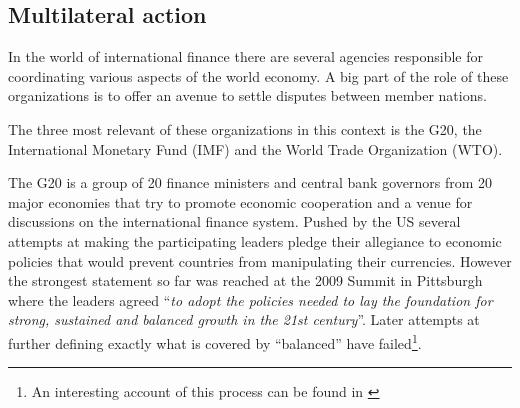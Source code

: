 



\subsection{Multilateral action}

In the world of international finance there are several agencies 
responsible for coordinating various aspects of the world economy. A big 
part of the role of these organizations is to offer an avenue to settle 
disputes between member nations. %

The three most relevant of these organizations in this context is the 
G20, the International Monetary Fund (IMF) and the World Trade 
Organization (WTO).

The G20 is a group of 20 finance ministers and central bank governors 
from 20 major economies that try to promote economic cooperation and a 
venue for discussions on the international finance system. Pushed by the 
US several attempts at making the participating leaders pledge their 
allegiance to economic policies that would prevent countries from 
manipulating their currencies. However the strongest statement so far 
was reached at the 2009 Summit in Pittsburgh where the leaders agreed 
``\textit{to adopt the policies needed to lay the foundation for strong, 
sustained and balanced growth in the 21st century}''. Later attempts at 
further defining exactly what is covered by ``balanced'' have 
failed\footnote{An interesting account of this process can be found in 
\cite{Levy11}}.

